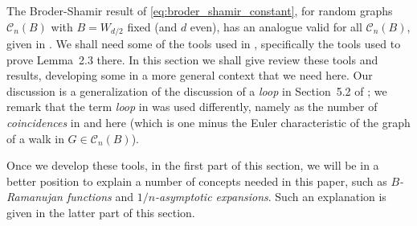 \documentclass{memo-l}
\theoremstyle{plain}
\theoremstyle{definition}
\numberwithin{section}{chapter}
\numberwithin{equation}{chapter}
\theoremstyle{plain}
\theoremstyle{definition}
\newcommand\cC{\mathcal{C}}
\begin{document}
The Broder-Shamir result \cite{broder} of \eqref{eq:broder_shamir_constant}, 
for random graphs $\cC_n(B)$ with $B=W_{d/2}$
fixed (and $d$ even), has an analogue valid for all
$\cC_n(B)$, given in \cite{friedman_relative}.  
We shall need some of the tools used in \cite{friedman_relative},
specifically the tools used to prove Lemma~2.3 there.
In this section
we shall give review these tools and results, 
developing some in a more general
context that we need here.
Our discussion is a generalization of the discussion of a {\em loop}
in Section~5.2 of \cite{friedman_alon}; we remark that the term
{\em loop} in \cite{broder} was used differently, namely as
the number of {\em coincidences} in
\cite{friedman_random_graphs,friedman_relative,friedman_alon}
and here (which is one minus the Euler characteristic of the
graph of a walk in $G\in\cC_n(B)$).

Once we develop these tools, in the first part of this 
section, we will be in a better position
to explain
a number of concepts needed in this paper, such
as {\em $B$-Ramanujan functions} and {\em $1/n$-asymptotic expansions}.
Such an explanation is given in the latter part
of this section.

% 

% 
% 
% 
\end{document}
